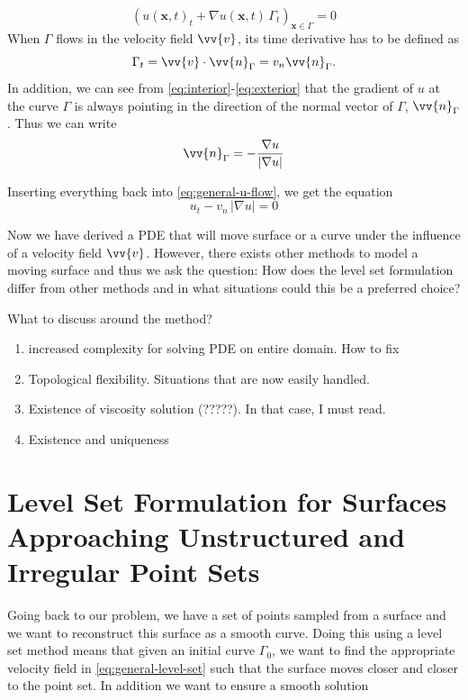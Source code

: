 \begin{equation}
    (u(\mathbf{x}, t)_t + \nabla u(\mathbf{x}, t) \, \Gamma_t)_{\mathbf{x}\in \Gamma} = 0
    \label{eq:general-u-flow}
\end{equation}
When $\Gamma$ flows in the velocity field $\vv{v}$, its time derivative has to be 
defined as 
\begin{equation}
    \Gamma_t = \vv{v}\cdot \vv{n}_{\Gamma} = v_n \vv{n}_{\Gamma}.
\end{equation}
In addition, we can see from \eqref{eq:interior}-\eqref{eq:exterior} that the gradient 
of $u$ at the curve $\Gamma$ is always pointing in the direction of the normal vector of 
$\Gamma$, $\vv{n}_{\Gamma}$. Thus we can write 
\begin{equation}
    \vv{n}_{\Gamma} = -\frac{\nabla u}{|\nabla u|}
\end{equation}

Inserting everything back into \eqref{eq:general-u-flow}, we get the equation
\begin{equation}
    u_t - v_n\, |\nabla u| = 0
    \label{eq:general-level-set}
\end{equation}

Now we have derived a PDE that will move surface or a curve under the influence
of a velocity field $\vv{v}$. However, there exists other methods to model
a moving surface and thus we ask the question: How does the level set 
formulation differ from other methods and in what situations could this be 
a preferred choice?




What to discuss around the method?
\begin{enumerate}
    \item increased complexity for solving PDE on entire domain. How to fix
    \item Topological flexibility. Situations that are now easily handled.
    \item Existence of viscosity solution (?????). In that case, I must read.
    \item Existence and uniqueness
\end{enumerate}

\newpage
\section{Level Set Formulation for Surfaces Approaching Unstructured and Irregular Point Sets}
Going back to our problem, we have a set of points sampled from a surface and we want to
reconstruct this surface as a smooth curve. Doing this using
a level set method means that given an initial curve $\Gamma_0$, we want to find the 
appropriate velocity field in \eqref{eq:general-level-set} such that the surface moves
closer and closer to the point set. In addition we want to ensure a smooth solution

